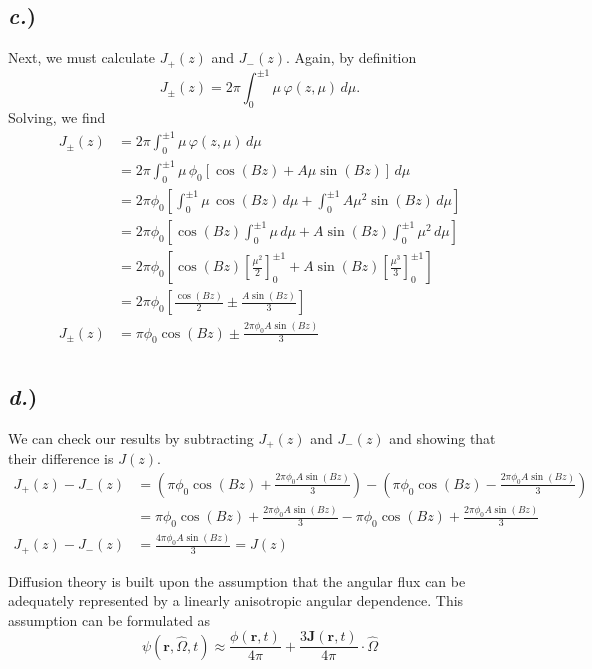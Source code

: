 \documentclass{article}
\newcommand{\Oh}{\hat{\Omega}}
\newcommand{\cur}{\bm{J}}
\newcommand{\rt}{(\bm{r},t)}
\newcommand{\rOt}{(\bm{r},\Oh,t)}
\begin{document}
\subsection*{\textit{c.})}

Next, we must calculate $J_{+}(z)$ and $J_{-}(z)$. Again, by definition
$$ J_{\pm}(z) = 2\pi \int_0^{\pm1} \mu \, \varphi(z,\mu) \, d\mu .$$
Solving, we find
\begin{align*}
J_{\pm}(z)	&= 2\pi \int_0^{\pm1} \mu \, \varphi(z,\mu) \, d\mu \\
			&= 2\pi \int_0^{\pm1} \mu \, \phi_0 \left[\cos(Bz) + A \mu \sin(Bz)\right] \, d\mu \\
			&= 2\pi\phi_0 \left[ \int_0^{\pm1} \mu \, \cos(Bz) \, d\mu + \int_0^{\pm1} A \mu^2 \sin(Bz) \, d\mu \right] \\ 
			&= 2\pi\phi_0 \left[ \cos(Bz) \int_0^{\pm1} \mu \, d\mu + A \sin(Bz) \int_0^{\pm1} \mu^2 \, d\mu \right] \\ 
			&= 2\pi\phi_0 \left[ \cos(Bz) \left[ \frac{\mu^2}{2} \right]_0^{\pm1} + A \sin(Bz) \left[ \frac{\mu^3}{3} \right]_0^{\pm1} \right] \\ 
			&= 2\pi\phi_0 \left[ \frac{\cos(Bz)}{2} \pm \frac{A \sin(Bz)}{3} \right] \\
J_{\pm}(z)	&= \pi\phi_0\cos(Bz) \pm \frac{2\pi\phi_0 A \sin(Bz)}{3} \\ 
\end{align*}


\subsection*{\textit{d.})}

We can check our results by subtracting $J_{+}(z)$ and $J_{-}(z)$ and showing that their difference is $J(z)$. 
\begin{align*}
J_{+}(z) - J_{-}(z)	&= \left(\pi\phi_0\cos(Bz) + \frac{2\pi\phi_0 A \sin(Bz)}{3}\right) - \left(\pi\phi_0\cos(Bz) - \frac{2\pi\phi_0 A \sin(Bz)}{3}\right) \\
					&= \pi\phi_0\cos(Bz) + \frac{2\pi\phi_0 A \sin(Bz)}{3} - \pi\phi_0\cos(Bz) + \frac{2\pi\phi_0 A \sin(Bz)}{3} \\
J_{+}(z) - J_{-}(z)	&= \frac{4\pi\phi_0 A \sin(Bz)}{3} = J(z)
\end{align*}




Diffusion theory is built upon the assumption that the angular flux can be adequately represented by a linearly anisotropic angular dependence. This assumption can be formulated as
$$\psi\rOt \approx \frac{\phi\rt}{4\pi} + \frac{3\cur\rt}{4\pi}\cdot \Oh$$
\end{document}
